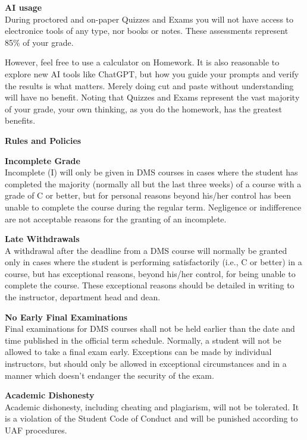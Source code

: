 \documentclass[12pt]{article}
\renewcommand{\emph}[1]{\textsf{\textbf{#1}}}
\newcommand{\localhead}[1]{\par\smallskip\textbf{#1} \smallskip\nobreak\\}%
\def\heading#1{\localhead{\large\emph{#1}}}
\def\subheading#1{\localhead{\emph{#1}}}
\begin{document}
\heading{AI usage}
During proctored and on-paper Quizzes and Exams you will not have access to electronice tools of any type, nor books or notes.  These assessments represent 85\% of your grade.

However, feel free to use a calculator on Homework.  It is also reasonable to explore new AI tools like ChatGPT, but how you guide your prompts and verify the results is what matters.  Merely doing cut and paste without understanding will have no benefit.  Noting that Quizzes and Exams represent the vast majority of your grade, your own thinking, as you do the homework, has the greatest benefits.

\newpage

\heading{Rules and Policies}
\vskip -20pt

\subheading{Incomplete Grade} 
Incomplete (I) will only be given in
  DMS courses in cases where
  the student has completed the majority (normally all but the last
  three weeks) of a course with a grade of C or better, but for
  personal reasons beyond his/her control has been unable to complete
  the course during the regular term. Negligence or indifference are
  not acceptable reasons for the granting of an incomplete. 

\subheading{Late Withdrawals} 
A withdrawal after the deadline from a DMS course will
  normally be granted only in cases where the student is performing
  satisfactorily (i.e., C or better) in a course, but has exceptional
  reasons, beyond his/her control, for being unable to complete the
  course. These exceptional reasons should be detailed in writing to
  the instructor, department head and dean.

\subheading{No Early Final Examinations}
Final examinations for DMS
  courses shall not be held earlier than the date and time published
  in the official term schedule. Normally, a student will not be
  allowed to take a final exam early. Exceptions can be made by
  individual instructors, but should only be allowed in exceptional
  circumstances and in a manner which doesn't endanger the security of
  the exam.

\subheading{Academic Dishonesty}
Academic dishonesty, including cheating and plagiarism, will not
be tolerated.  It is a violation of the Student Code of Conduct
and will be punished according to UAF procedures.

\end{document}
